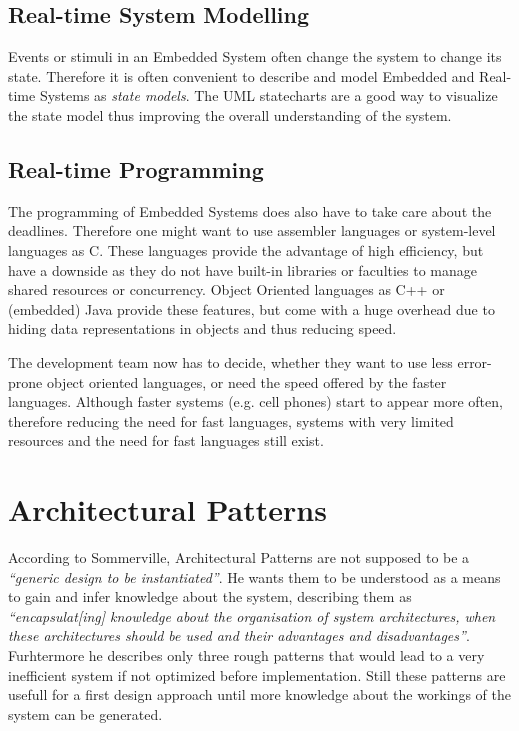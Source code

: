 \documentclass[10pt,a4paper,titlepage,draft]{scrartcl} %
\begin{document}
\subsection{Real-time System Modelling}
Events or stimuli in an Embedded System often change the system to change its state.
Therefore it is often convenient to describe and model Embedded and Real-time Systems as \emph{state models}.
The UML statecharts are a good way to visualize the state model thus improving the overall understanding of the system.

\subsection{Real-time Programming}
The programming of Embedded Systems does also have to take care about the deadlines.
Therefore one might want to use assembler languages or system-level languages as C.
These languages provide the advantage of high efficiency, but have a downside as they do not have built-in libraries or faculties to manage shared resources or concurrency.
Object Oriented languages as C++ or (embedded) Java provide these features, but come with a huge overhead due to hiding data representations in objects and thus reducing speed.

The development team now has to decide, whether they want to use less error-prone object oriented languages, or need the speed offered by the faster languages.
Although faster systems (e.g. cell phones) start to appear more often, therefore reducing the need for fast languages, systems with very limited resources and the need for fast languages still exist.


\section{Architectural Patterns}
According to Sommerville, Architectural Patterns are not supposed to be a \textit{``generic design to be instantiated''\cite[p. 547]{sommerville}}.
He wants them to be understood as a means to gain and infer knowledge about the system, describing them as \textit{``encapsulat[ing] knowledge about the organisation of system architectures, when these architectures should be used and their advantages and disadvantages''\cite[p.547]{sommerville}}.
Furhtermore he describes only three rough patterns that would lead to a very inefficient system if not optimized before implementation.
Still these patterns are usefull for a first design approach until more knowledge about the workings of the system can be generated.
\end{document}
